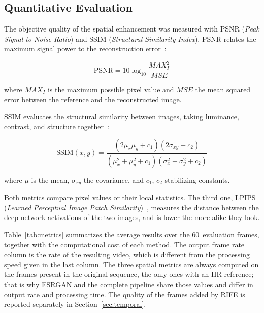 \documentclass[conference]{IEEEtran}
\begin{document}
\subsection{Quantitative Evaluation}
\label{sec:metrics}

The objective quality of the spatial enhancement was measured with PSNR (\textit{Peak Signal-to-Noise Ratio}) and SSIM (\textit{Structural Similarity Index}). PSNR relates the maximum signal power to the reconstruction error~\cite{huynhthu2008psnr}:

\begin{equation}
    \mathrm{PSNR} = 10\log_{10}\frac{MAX_I^{2}}{MSE}
    \label{eq:psnr}
\end{equation}

\noindent where $MAX_I$ is the maximum possible pixel value and $MSE$ the mean squared error between the reference and the reconstructed image.

SSIM evaluates the structural similarity between images, taking luminance, contrast, and structure together~\cite{wang2004ssim}:

\begin{equation}
    \mathrm{SSIM}(x,y) =
        \frac{(2\mu_x\mu_y + c_1)(2\sigma_{xy} + c_2)}
             {(\mu_x^2 + \mu_y^2 + c_1)(\sigma_x^2 + \sigma_y^2 + c_2)}
    \label{eq:ssim}
\end{equation}

\noindent where $\mu$ is the mean, $\sigma_{xy}$ the covariance, and $c_1$, $c_2$ stabilizing constants.

Both metrics compare pixel values or their local statistics. The third one, LPIPS (\textit{Learned Perceptual Image Patch Similarity})~\cite{zhang2018lpips}, measures the distance between the deep network activations of the two images, and is lower the more alike they look.

Table~\ref{tab:metrics} summarizes the average results over the 60~evaluation frames, together with the computational cost of each method. The output frame rate column is the rate of the resulting video, which is different from the processing speed given in the last column. The three spatial metrics are always computed on the frames present in the original sequence, the only ones with an HR reference; that is why ESRGAN and the complete pipeline share those values and differ in output rate and processing time. The quality of the frames added by RIFE is reported separately in Section~\ref{sec:temporal}.
\end{document}
